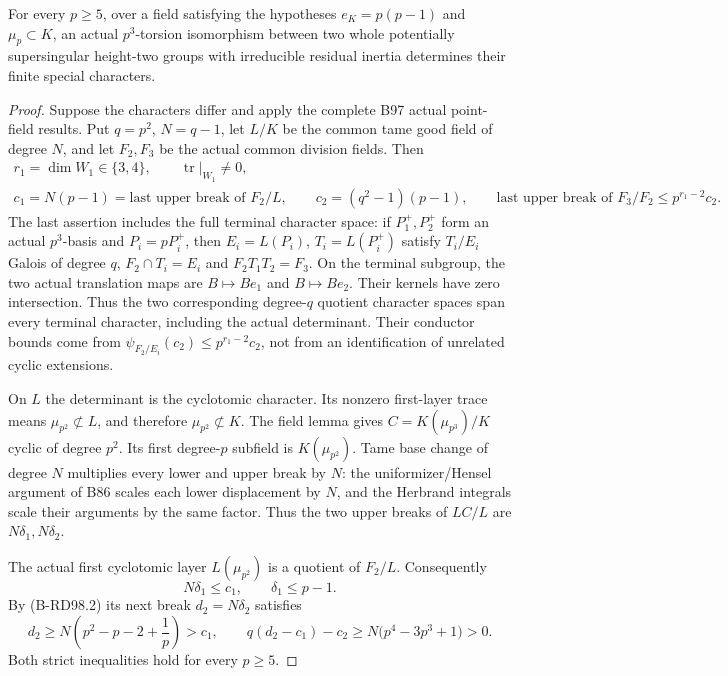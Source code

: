 \begin{theorem}
\label{thm:B-RD98-irreducible}
For every $p\ge5$, over a field satisfying the hypotheses
$e_K=p(p-1)$ and $\mu_p\subset K$, an actual $p^3$-torsion
isomorphism between two whole potentially supersingular
height-two groups with irreducible residual inertia determines
their finite special characters.
\end{theorem}
\begin{proof}
Suppose the characters differ and apply the complete B97
actual point-field results. Put $q=p^2$, $N=q-1$, let $L/K$
be the common tame good field of degree $N$, and let $F_2,F_3$
be the actual common division fields. Then
\[
\begin{gathered}
 r_1=\dim W_1\in\{3,4\},\qquad
       \operatorname{tr}|_{W_1}\ne0,\\
 c_1=N(p-1)=\text{last upper break of }F_2/L,\qquad
 c_2=(q^2-1)(p-1),\qquad
 \text{last upper break of }F_3/F_2\le p^{r_1-2}c_2.
\end{gathered}                                          \tag{B-RD98.10}
\]
The last assertion includes the full terminal character space:
if $P_1^+,P_2^+$ form an actual $p^3$-basis and
$P_i=pP_i^+$, then $E_i=L(P_i)$, $T_i=L(P_i^+)$ satisfy
$T_i/E_i$ Galois of degree $q$, $F_2\cap T_i=E_i$ and
$F_2T_1T_2=F_3$. On the terminal subgroup, the two actual
translation maps are $B\mapsto Be_1$ and $B\mapsto Be_2$.
Their kernels have zero intersection. Thus the two corresponding
degree-$q$ quotient character spaces span every terminal
character, including the actual determinant. Their conductor
bounds come from $\psi_{F_2/E_i}(c_2)\le p^{r_1-2}c_2$,
not from an identification of unrelated cyclic extensions.

On $L$ the determinant is the cyclotomic character. Its
nonzero first-layer trace means $\mu_{p^2}\not\subset L$,
and therefore $\mu_{p^2}\not\subset K$. The field lemma
gives $C=K(\mu_{p^3})/K$ cyclic of degree $p^2$.
Its first degree-$p$ subfield is $K(\mu_{p^2})$.
Tame base change of degree $N$ multiplies every lower and
upper break by $N$: the uniformizer/Hensel argument of B86
scales each lower displacement by $N$, and the Herbrand
integrals scale their arguments by the same factor.
Thus the two upper breaks of $LC/L$ are $N\delta_1,N\delta_2$.

The actual first cyclotomic layer $L(\mu_{p^2})$ is a quotient
of $F_2/L$. Consequently
\[
                         N\delta_1\le c_1,
                   \qquad \delta_1\le p-1.
                                                        \tag{B-RD98.11}
\]
By (B-RD98.2) its next break $d_2=N\delta_2$ satisfies
\[
 d_2\ge N\left(p^2-p-2+\frac1p\right)>c_1,
 \qquad q(d_2-c_1)-c_2
          \ge N\bigl(p^4-3p^3+1\bigr)>0.
                                                        \tag{B-RD98.12}
\]
Both strict inequalities hold for every $p\ge5$.


\end{proof}
